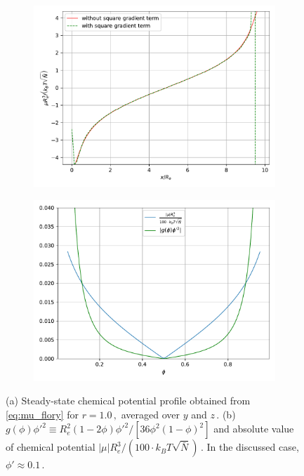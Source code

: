 \documentclass[bachelor,       %
               twoside,        %
               BCOR10mm,       %
               ngerman, english %
               ]{GAUBM}
\begin{document}
\begin{figure}[h]
  \centering
  \begin{subfigure}[b]{0.45\textwidth}
      \centering
      \includegraphics[width=\textwidth]{figures/mu_coll_diff.pdf}
      \caption{}
      \label{fig:chemical_potential}
  \end{subfigure}
    \hfill
  \begin{subfigure}[b]{0.45\textwidth}
      \centering
      \includegraphics[width=\textwidth]{figures/squaregradient_contribution.pdf}
      \caption{}
      \label{fig:gradmu_fft}
  \end{subfigure}
     \caption{(a) Steady-state chemical potential profile obtained from \eqref{eq:mu_flory} for $r=1.0\,,$ averaged over $y$ and $z\,.$ (b) $g(\phi)\phi'^2\equiv R_e^2(1-2\phi)\phi'^2/[36\phi^2(1-\phi)^2]$ and absolute value of chemical potential $|\mu|R_e^3/(100\cdot k_BT\sqrt{\bar{N}})\,.$ In the discussed case, $\phi'\approx 0.1\,.$ }
     \label{fig:squaregradient_contribution}
\end{figure}
\end{document}
